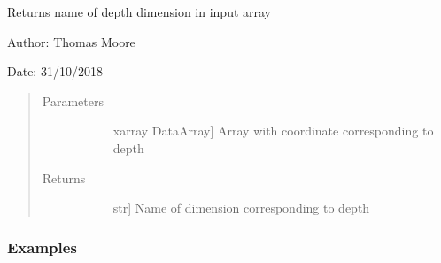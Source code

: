 \documentclass[letterpaper,10pt,english]{sphinxmanual}
\begin{document}
\begin{fulllineitems}
\label{\detokenize{utils_doc:utils.get_depth_name}}
Returns name of depth dimension in input array

\begin{DUlineblock}{0em}
\item[] Author: Thomas Moore
\item[] Date: 31/10/2018
\end{DUlineblock}
\begin{quote}\begin{description}
\item[{Parameters}] \leavevmode\begin{description}
\item[{}] \leavevmode{[}xarray DataArray{]}
Array with coordinate corresponding to depth

\end{description}

\item[{Returns}] \leavevmode\begin{description}
\item[{}] \leavevmode{[}str{]}
Name of dimension corresponding to depth

\end{description}

\end{description}\end{quote}
\subsubsection*{Examples}


\end{fulllineitems}
\end{document}
